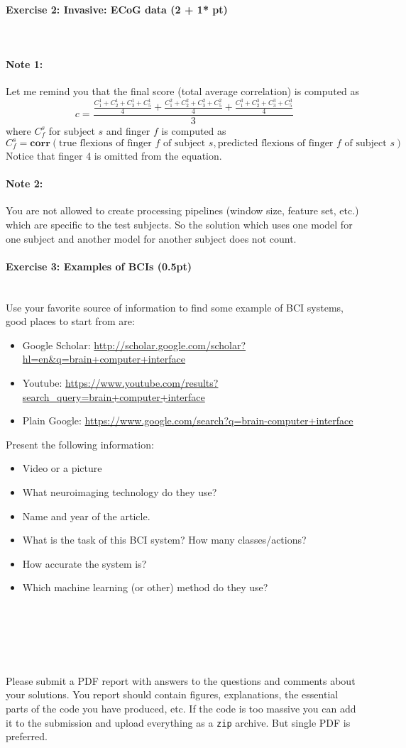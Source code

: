 \documentclass[a4paper,11pt]{article}
\newenvironment{exercise}[3]{\paragraph{Exercise #1: #2 (#3pt)}\ \\}{
\medskip}
\begin{document}
\begin{exercise}{2}{Invasive: ECoG data}{2 + 1* }
\paragraph{Note 1:} Let me remind you that the final score (total average correlation) is computed as
$$c = \displaystyle\frac{\displaystyle\frac{C^1_1 + C^1_2 + C^1_3 + C^1_5}{4} + \frac{C^2_1 + C^2_2 + C^2_3 + C^2_5}{4} + \frac{C^3_1 + C^3_2 + C^3_3 + C^3_5}{4}}{3}$$
where $C^s_f$ for subject $s$ and finger $f$ is computed as
$$C^s_f = \mathbf{corr}(\text{true flexions of finger $f$ of subject $s$}, \text{predicted flexions of finger $f$ of subject $s$})$$
Notice that finger 4 is omitted from the equation.

\paragraph{Note 2:} You are not allowed to create processing pipelines (window size, feature set, etc.) which are specific to the test subjects. So the solution which uses one model for one subject and another model for another subject does not count.

\end{exercise}


%
%
\begin{exercise}{3}{Examples of BCIs}{0.5}
Use your favorite source of information to find some example of BCI systems, good places to start from are:
\begin{itemize}
\itemsep 0em
	\item Google Scholar: \url{http://scholar.google.com/scholar?hl=en&q=brain+computer+interface}
	\item Youtube: \url{https://www.youtube.com/results?search_query=brain+computer+interface}
	\item Plain Google: \url{https://www.google.com/search?q=brain-computer+interface}
\end{itemize}
Present the following information:
\begin{itemize}
\itemsep 0em
	\item Video or a picture
	\item What neuroimaging technology do they use?
	\item Name and year of the article.
	\item What is the task of this BCI system? How many classes/actions?
	\item How accurate the system is?
	\item Which machine learning (or other) method do they use?
\end{itemize}
\end{exercise}


\ \\
\ \\
\ \\
\ \\
\ \\
Please submit a PDF report with answers to the questions and comments about your solutions. You report should contain figures, explanations, the essential parts of the code you have produced, etc. If the code is too massive you can add it to the submission and upload everything as a \texttt{zip} archive. But single PDF is preferred.
\end{document}
